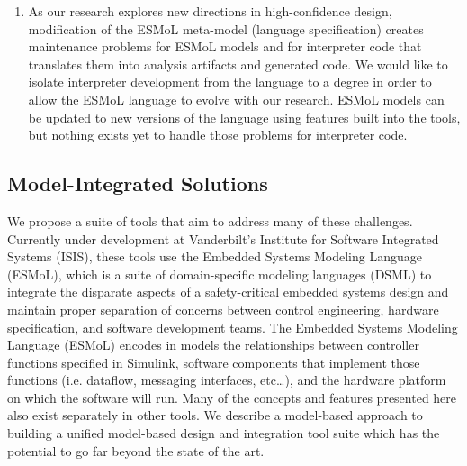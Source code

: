 \begin{enumerate}
 \item As our research explores new directions in 
high-confidence design, modification of the ESMoL 
meta-model (language specification) creates maintenance 
problems for ESMoL models and for interpreter code 
that translates them into analysis artifacts and 
generated code.  We would like to isolate interpreter
development from the language to a degree in order 
to allow the ESMoL language to evolve with our research.  ESMoL models
can be updated to new versions of the language using 
features built into the tools, but nothing exists 
yet to handle those problems for interpreter code.  

\end{enumerate}

\subsection*{Model-Integrated Solutions}
\label{section:solutions}

We propose a suite of tools
that aim to address many of these challenges.  Currently 
under development at Vanderbilt's Institute for Software 
Integrated Systems (ISIS), these tools use the Embedded 
Systems Modeling Language (ESMoL), which is a suite of 
domain-specific modeling languages (DSML) to integrate the 
disparate aspects of a safety-critical embedded systems design 
and maintain proper separation of concerns between control 
engineering, hardware specification, and software development 
teams.  The Embedded Systems Modeling Language (ESMoL) encodes 
in models the relationships between controller functions
specified in Simulink, software components that implement
those functions (i.e. dataflow, messaging interfaces, 
etc\ldots), and the hardware platform on which the software
will run.  Many of the concepts and features presented here also 
exist separately in other tools.  We describe a model-based 
approach to building a unified model-based design and 
integration tool suite which has the potential to go far 
beyond the state of the art.

